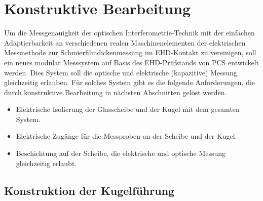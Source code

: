 \chapter{Konstruktive Bearbeitung}
\label{chap:konstruktive_bearbeitung}

Um die Messgenauigkeit der optischen Interferometrie-Technik mit der einfachen Adaptierbarkeit an verschiedenen realen Maschinenelementen der elektrischen Messmethode zur Schmierfilmdickenmessung im EHD-Kontakt zu vereinigen, soll ein neues modular Messsystem auf Basis des EHD-Prüfstands von PCS entwickelt werden.
Dies System soll die optische und elektrische (kapazitive) Messung gleichzeitig erlauben.
Für solches System gibt es die folgende Anforderungen, die durch konstruktive Bearbeitung in nächsten Abschnitten gelöst werden.
\begin{itemize}
    \item Elektrische Isolierung der Glasscheibe und der Kugel mit dem gesamten System.
    \item Elektrische Zugänge für die Messproben an der Scheibe und der Kugel.
    \item Beschichtung auf der Scheibe, die elektrische und optische Messung gleichzeitig erlaubt.
\end{itemize}

\section{Konstruktion der Kugelführung}
\label{sec:konstruktion_der_kugelfuehrung}

